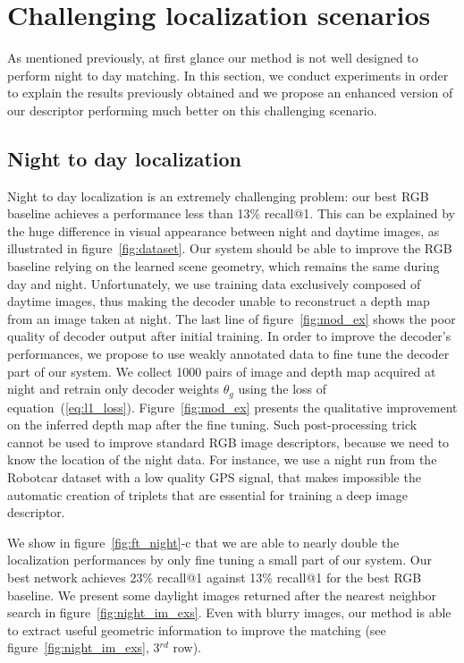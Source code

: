 \section{Challenging localization scenarios}
\label{sec:chall_loc}

As mentioned previously, at first glance our method is not well designed to perform night to day matching. In this section, we conduct experiments in order to explain the results previously obtained and we propose an enhanced version of our descriptor performing much better on this challenging scenario.

\subsection{Night to day localization}
\label{subsec:night2day}

Night to day localization is an extremely challenging problem: our best RGB baseline achieves a performance less than 13\% recall@1. This can be explained by the huge difference in visual appearance between night and daytime images, as illustrated in figure~\ref{fig:dataset}. Our system should be able to improve the RGB baseline relying on the learned scene geometry, which remains the same during day and night. Unfortunately, we use training data exclusively composed of daytime images, thus making the decoder unable to reconstruct a depth map from an image taken at night. The last line of figure~\ref{fig:mod_ex} shows the poor quality of decoder output after initial training. In order to improve the decoder's performances, we propose to use weakly annotated data to fine tune the decoder part of our system. We collect 1000 pairs of image and depth map acquired at night and retrain only decoder weights $\theta_g$ using the loss of equation~(\ref{eq:l1_loss}). Figure~\ref{fig:mod_ex} presents the qualitative improvement on the inferred depth map after the fine tuning. Such post-processing trick cannot be used to improve standard RGB image descriptors, because we need to know the location of the night data. For instance, we use a night run from the Robotcar dataset with a low quality GPS signal, that makes impossible the automatic creation of triplets that are essential for training a deep image descriptor. 

We show in figure~\ref{fig:ft_night}-c that we are able to nearly double the localization performances by only fine tuning a small part of our system. Our best network achieves 23\% recall@1 against 13\% recall@1 for the best RGB baseline. We present some daylight images returned after the nearest neighbor search in figure~\ref{fig:night_im_exs}. Even with blurry images, our method is able to extract useful geometric information to improve the matching (see figure~\ref{fig:night_im_exs}, 3$^{rd}$ row).

